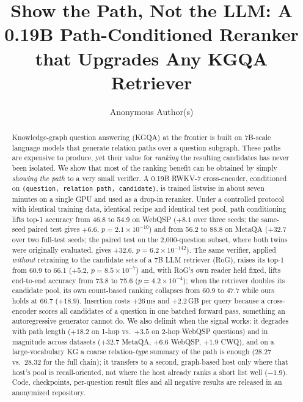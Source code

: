 \documentclass[sigconf,review,anonymous]{acmart}
\begin{document}
\title{Show the Path, Not the LLM: A 0.19B Path-Conditioned Reranker that Upgrades Any KGQA Retriever}

\author{Anonymous Author(s)}

\begin{abstract}
Knowledge-graph question answering (KGQA) at the frontier is built on 7B-scale language models that generate relation paths over a question subgraph. These paths are expensive to produce, yet their value for \emph{ranking} the resulting candidates has never been isolated. We show that most of the ranking benefit can be obtained by simply \emph{showing the path} to a very small verifier. A 0.19B RWKV-7 cross-encoder, conditioned on \texttt{(question, relation path, candidate)}, is trained listwise in about seven minutes on a single GPU and used as a drop-in reranker.
Under a controlled protocol with identical training data, identical recipe and identical test pool, path conditioning lifts top-1 accuracy from 46.8 to 54.9 on WebQSP ($+8.1$ over three seeds; the same-seed paired test gives $+6.6$, $p=2.1\times10^{-10}$) and from 56.2 to 88.8 on MetaQA ($+32.7$ over two full-test seeds; the paired test on the 2{,}000-question subset, where both twins were originally evaluated, gives $+32.6$, $p=6.2\times10^{-142}$). The same verifier, applied \emph{without} retraining to the candidate sets of a 7B LLM retriever (RoG), raises its top-1 from 60.9 to 66.1 ($+5.2$, $p=8.5\times10^{-7}$) and, with RoG's own reader held fixed, lifts end-to-end accuracy from 73.8 to 75.6 ($p=4.2\times10^{-4}$); when the retriever doubles its candidate pool, its own count-based ranking collapses from 60.9 to 47.7 while ours holds at 66.7 ($+18.9$).
Insertion costs $+26$\,ms and $+2.2$\,GB per query because a cross-encoder scores all candidates of a question in one batched forward pass, something an autoregressive generator cannot do. We also delimit when the signal works: it degrades with path length ($+18.2$ on 1-hop vs.\ $+3.5$ on 2-hop WebQSP questions) and in magnitude across datasets ($+32.7$ MetaQA, $+6.6$ WebQSP, $+1.9$ CWQ), and on a large-vocabulary KG a coarse relation-\emph{type} summary of the path is enough (28.27 vs.\ 28.32 for the full chain); it transfers to a second, graph-based host only where that host's pool is recall-oriented, not where the host already ranks a short list well ($-1.9$). Code, checkpoints, per-question result files and all negative results are released in an anonymized repository.
\end{abstract}
\end{document}

